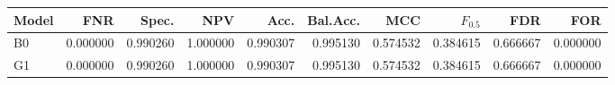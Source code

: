 \begin{tabular}{lrrrrrrrrr}
\toprule
Model & FNR & Spec. & NPV & Acc. & Bal.Acc. & MCC & $F_{0.5}$ & FDR & FOR \\
\midrule
B0 & 0.000000 & 0.990260 & 1.000000 & 0.990307 & 0.995130 & 0.574532 & 0.384615 & 0.666667 & 0.000000 \\
G1 & 0.000000 & 0.990260 & 1.000000 & 0.990307 & 0.995130 & 0.574532 & 0.384615 & 0.666667 & 0.000000 \\
\bottomrule
\end{tabular}
